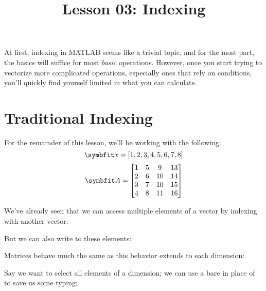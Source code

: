 \documentclass{article}
\title{Lesson 03: Indexing}
\begin{document}
\renderTitle

At first, indexing in MATLAB seems like a trivial topic, and for the
most part, the basics will suffice for most \emph{basic} operations.
However, once you start trying to vectorize more complicated operations,
especially ones that rely on conditions, you'll quickly find yourself
limited in what you can calculate.

\section{Traditional Indexing}

For the remainder of this lesson, we'll be working with the following:
\begin{equation}
	\mat{x}
	=
	[1, 2, 3, 4, 5, 6, 7, 8]
\end{equation}
\begin{equation}
	\mat{A}
	=
	\begin{bmatrix}
		1 & 5 &  9 & 13 \\
		2 & 6 & 10 & 14 \\
		3 & 7 & 10 & 15 \\
		4 & 8 & 11 & 16 \\
	\end{bmatrix}
\end{equation}

We've already seen that we can access multiple elements of a vector by
indexing with another vector:


But we can also write to these elements:


Matrices behave much the same as this behavior extends to each
dimension:


Say we want to select all elements of a dimension; we can use a bare
\mCommand{:} in place of  to save us some typing:

\end{document}
